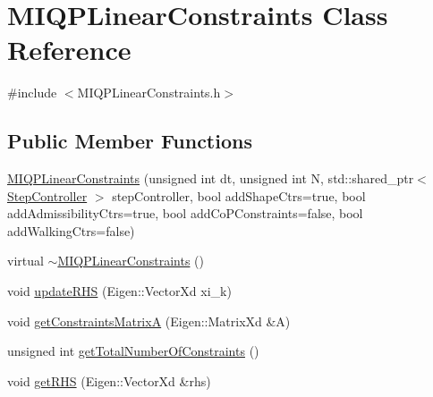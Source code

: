 \hypertarget{classMIQPLinearConstraints}{\section{\-M\-I\-Q\-P\-Linear\-Constraints \-Class \-Reference}
\label{classMIQPLinearConstraints}
}


{\ttfamily \#include $<$\-M\-I\-Q\-P\-Linear\-Constraints.\-h$>$}

\subsection*{\-Public \-Member \-Functions}
\begin{DoxyCompactItemize}
\item 
\hyperlink{classMIQPLinearConstraints_ae784e0e4a3fbde27d999c5315119fa0f}{\-M\-I\-Q\-P\-Linear\-Constraints} (unsigned int dt, unsigned int \-N, std\-::shared\-\_\-ptr$<$ \hyperlink{classStepController}{\-Step\-Controller} $>$ step\-Controller, bool add\-Shape\-Ctrs=true, bool add\-Admissibility\-Ctrs=true, bool add\-Co\-P\-Constraints=false, bool add\-Walking\-Ctrs=false)
\item 
virtual \hyperlink{classMIQPLinearConstraints_a1539d3c8eb2af42daa9bb17dd0f44bd2}{$\sim$\-M\-I\-Q\-P\-Linear\-Constraints} ()
\item 
void \hyperlink{classMIQPLinearConstraints_aad3232078ef93e2105a1c619c510f16a}{update\-R\-H\-S} (\-Eigen\-::\-Vector\-Xd xi\-\_\-k)
\item 
void \hyperlink{classMIQPLinearConstraints_ab556e990dcc0b1fcd152f41a8c00e1f6}{get\-Constraints\-Matrix\-A} (\-Eigen\-::\-Matrix\-Xd \&\-A)
\item 
unsigned int \hyperlink{classMIQPLinearConstraints_a656681ab464709b025e4522df3458fa1}{get\-Total\-Number\-Of\-Constraints} ()
\item 
void \hyperlink{classMIQPLinearConstraints_abf2bd3e8f0dfa5b919efa1b90b56232a}{get\-R\-H\-S} (\-Eigen\-::\-Vector\-Xd \&rhs)
\end{DoxyCompactItemize}
